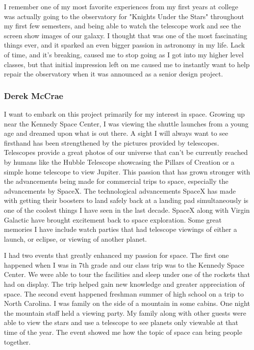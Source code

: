 \documentclass[12pt]{report}
\begin{document}
I remember one of my most favorite experiences from my first years at college was actually going to the observatory for "Knights Under the Stars" throughout my first few semesters, and being able to watch the telescope work and see the screen show images of our galaxy. I thought that was one of the most fascinating things ever, and it sparked an even bigger passion in astronomy in my life. Lack of time, and it's breaking, caused me to stop going as I got into my higher level classes, but that initial impression left on me caused me to instantly want to help repair the observatory when it was announced as a senior design project.

\subsubsection*{Derek McCrae}

I want to embark on this project primarily for my interest in space. Growing up near the Kennedy Space Center, I was viewing the shuttle launches from a young age and dreamed upon what is out there. A sight I will always want to see firsthand has been strengthened by the pictures provided by telescopes. Telescopes provide a great photos of our universe that can't be currently reached by humans like the Hubble Telescope showcasing the Pillars of Creation or a simple home telescope to view Jupiter. This passion that has grown stronger with the advancements being made for commercial trips to space, especially the advancements by SpaceX. The technological advancements SpaceX has made with getting their boosters to land safely back at a landing pad simultaneously is one of the coolest things I have seen in the last decade. SpaceX along with Virgin Galactic have brought excitement back to space exploration. Some great memories I have include watch parties that had telescope viewings of either a launch, or eclipse, or viewing of another planet.

I had two events that greatly enhanced my passion for space. The first one happened when I was in 7th grade and our class trip was to the Kennedy Space Center. We were able to tour the facilities and sleep under one of the rockets that had on display. The trip helped gain new knowledge and greater appreciation of space. The second event happened freshman summer of high school on a trip to North Carolina. I was family on the side of a mountain in some cabins. One night the mountain staff held a viewing party. My family along with other guests were able to view the stars and use a telescope to see planets only viewable at that time of the year. The event showed me how the topic of space can bring people together.
\end{document}
